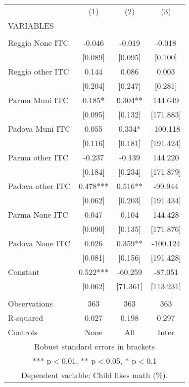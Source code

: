 \begin{tabular}{lccc} \hline
 & (1) & (2) & (3) \\
VARIABLES &  &  &  \\ \hline
 &  &  &  \\
Reggio None ITC & -0.046 & -0.019 & -0.018 \\
 & [0.089] & [0.095] & [0.100] \\
Reggio other ITC & 0.144 & 0.086 & 0.003 \\
 & [0.204] & [0.247] & [0.281] \\
Parma Muni ITC & 0.185* & 0.304** & 144.649 \\
 & [0.095] & [0.132] & [171.883] \\
Padova Muni ITC & 0.055 & 0.334* & -100.118 \\
 & [0.116] & [0.181] & [191.424] \\
Parma other ITC & -0.237 & -0.139 & 144.220 \\
 & [0.184] & [0.234] & [171.879] \\
Padova other ITC & 0.478*** & 0.516** & -99.944 \\
 & [0.062] & [0.203] & [191.434] \\
Parma None ITC & 0.047 & 0.104 & 144.428 \\
 & [0.090] & [0.135] & [171.876] \\
Padova None ITC & 0.026 & 0.359** & -100.124 \\
 & [0.081] & [0.156] & [191.428] \\
Constant & 0.522*** & -60.259 & -87.051 \\
 & [0.062] & [71.361] & [113.231] \\
 &  &  &  \\
Observations & 363 & 363 & 363 \\
R-squared & 0.027 & 0.198 & 0.297 \\
 Controls & None & All & Inter \\ \hline
\multicolumn{4}{c}{ Robust standard errors in brackets} \\
\multicolumn{4}{c}{ *** p$<$0.01, ** p$<$0.05, * p$<$0.1} \\
\multicolumn{4}{c}{ Dependent variable: Child likes math (\%).} \\
\end{tabular}
